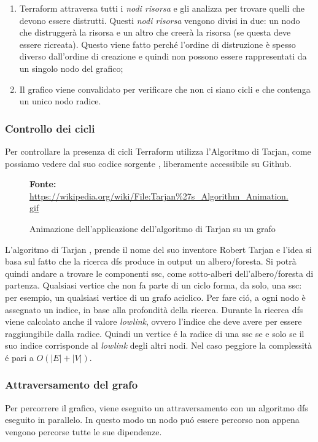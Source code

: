 \documentclass[12pt, a4paper, titlepage]{article}
\begin{document}
\begin{enumerate}
	\item Terraform attraversa tutti i \textit{nodi risorsa} e gli analizza per trovare quelli che devono essere distrutti. Questi \textit{nodi risorsa} vengono divisi in due: un nodo che distruggerà la risorsa e un altro che creerà la risorsa (se questa deve essere ricreata). Questo viene fatto perché l'ordine di distruzione è spesso diverso dall'ordine di creazione e quindi non possono essere rappresentati da un singolo nodo del grafico;

	\item Il grafico viene convalidato per verificare che non ci siano cicli e che contenga un unico nodo radice. 
\end{enumerate}

\subsubsection{Controllo dei cicli}

Per controllare la presenza di cicli Terraform utilizza l'Algoritmo di Tarjan, come possiamo vedere dal suo codice sorgente \cite{terraform_tarjan}, liberamente accessibile su Github.

\begin{figure}[ht!]
	\centering
	\caption{Animazione dell'applicazione dell'algoritmo di Tarjan su un grafo}
	\textbf{Fonte:} \url{https://wikipedia.org/wiki/File:Tarjan%27s_Algorithm_Animation.gif}
	\label{fig:cycle}
\end{figure}

L'algoritmo di Tarjan , prende il nome del suo inventore Robert Tarjan e l'idea si basa sul fatto che la ricerca \gls{dfs} produce in output un albero/foresta. Si potrà quindi andare a trovare le componenti \gls{ssc}, come sotto-alberi dell'albero/foresta di partenza. Qualsiasi vertice che non fa parte di un ciclo forma, da solo, una \gls{ssc}: per esempio, un qualsiasi vertice di un grafo aciclico. Per fare ció, a ogni nodo è assegnato un indice, in base alla profondità della ricerca. Durante la ricerca \gls{dfs} viene calcolato anche il valore \textit{lowlink}, ovvero l'indice che deve avere per essere raggiungibile dalla radice. Quindi un vertice é la radice di una \gls{ssc} se e solo se il suo indice corrisponde al \textit{lowlink} degli altri nodi. Nel caso peggiore la complessità é pari a $O(|E| + |V|)$.

\subsubsection{Attraversamento del grafo} 
Per percorrere il grafico, viene eseguito un attraversamento con un algoritmo \gls{dfs} eseguito in parallelo. In questo modo un nodo puó essere percorso non appena vengono percorse tutte le sue dipendenze.
\end{document}
